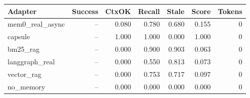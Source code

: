 \begin{tabular}{lrrrrrr}
\hline
Adapter & Success & CtxOK & Recall & Stale & Score & Tokens \\
\hline
mem0\_real\_async & -- & 0.080 & 0.780 & 0.680 & 0.155 & 0 \\
capsule & -- & 1.000 & 1.000 & 0.000 & 1.000 & 0 \\
bm25\_rag & -- & 0.000 & 0.900 & 0.903 & 0.063 & 0 \\
langgraph\_real & -- & 0.000 & 0.550 & 0.813 & 0.073 & 0 \\
vector\_rag & -- & 0.000 & 0.753 & 0.717 & 0.097 & 0 \\
no\_memory & -- & 0.000 & 0.000 & 0.000 & 0.000 & 0 \\
\hline
\end{tabular}
